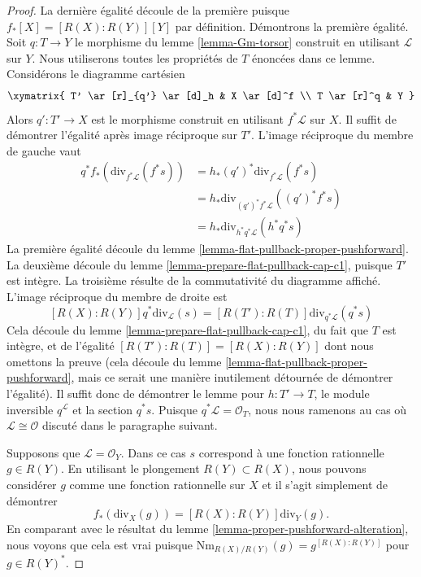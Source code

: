 \begin{proof}
La dernière égalité découle de la première puisque $f_*[X] = [R(X) :
R(Y)][Y]$ par définition. Démontrons la première égalité. Soit $q : T \to Y$ le
morphisme du lemme \ref{lemma-Gm-torsor} construit en utilisant $\mathcal{L}$
sur $Y$. Nous utiliserons toutes les propriétés de $T$ énoncées dans ce lemme.
Considérons le diagramme cartésien
$$
\xymatrix{
T' \ar[r]_{q'} \ar[d]_h & X \ar[d]^f \\
T \ar[r]^q & Y
}
$$
Alors $q' : T' \to X$ est le morphisme construit en utilisant $f^*\mathcal{L}$
sur $X$. Il suffit de démontrer l'égalité après image réciproque sur $T'$. L'image
réciproque du membre de gauche vaut
\begin{align*}
q^*f_*\left(\text{div}_{f^*\mathcal{L}}(f^*s)\right)
& =
h_*(q')^*\text{div}_{f^*\mathcal{L}}(f^*s) \\
& =
h_*\text{div}_{(q')^*f^*\mathcal{L}}((q')^*f^*s) \\
& =
h_*\text{div}_{h^*q^*\mathcal{L}}(h^*q^*s)
\end{align*}
La première égalité découle du lemme \ref{lemma-flat-pullback-proper-pushforward}.
La deuxième découle du lemme \ref{lemma-prepare-flat-pullback-cap-c1}, puisque
$T'$ est intègre. La troisième résulte de la commutativité du diagramme affiché.
L'image réciproque du membre de droite est
$$
[R(X) : R(Y)]q^*\text{div}_\mathcal{L}(s) =
[R(T') : R(T)]\text{div}_{q^*\mathcal{L}}(q^*s)
$$
Cela découle du lemme \ref{lemma-prepare-flat-pullback-cap-c1}, du fait que
$T$ est intègre, et de l'égalité $[R(T') : R(T)] = [R(X) : R(Y)]$ dont nous
omettons la preuve (cela découle du lemme
\ref{lemma-flat-pullback-proper-pushforward}, mais ce serait une manière
inutilement détournée de démontrer l'égalité). Il suffit donc de démontrer le lemme pour $h : T' \to T$,
le module inversible $q^\mathcal{L}$ et la section $q^*s$. Puisque
$q^*\mathcal{L} = \mathcal{O}_T$, nous nous ramenons au cas où $\mathcal{L} \cong
\mathcal{O}$ discuté dans le paragraphe suivant.

\medskip\noindent
Supposons que $\mathcal{L} = \mathcal{O}_Y$. Dans ce cas $s$ correspond à une
fonction rationnelle $g \in R(Y)$. En utilisant le plongement $R(Y) \subset
R(X)$, nous pouvons considérer $g$ comme une fonction rationnelle sur $X$ et il
s'agit simplement de démontrer
$$
f_*\left(\text{div}_X(g)\right) = [R(X) : R(Y)]\text{div}_Y(g).
$$
En comparant avec le résultat du lemme
\ref{lemma-proper-pushforward-alteration}, nous voyons que cela est vrai
puisque $\text{Nm}_{R(X)/R(Y)}(g) = g^{[R(X) : R(Y)]}$ pour $g \in R(Y)^*$.
\end{proof}

